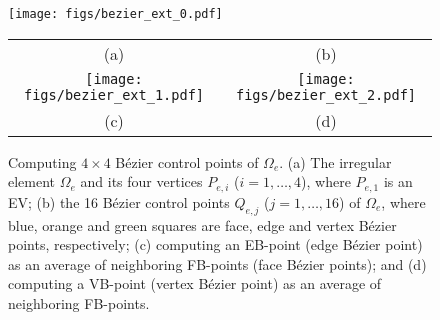 \documentclass[graybox]{svmult}
\begin{document}
\begin{figure}[htb]
\centering
\texttt{[image: figs/bezier\_ext\_0.pdf]}
\begin{tabular}{cc}
(a) & \hspace{-1.5cm} (b) \\
\texttt{[image: figs/bezier\_ext\_1.pdf]} & \hspace{+1mm}
\texttt{[image: figs/bezier\_ext\_2.pdf]} \\
(c) & (d) \\
\end{tabular}
\caption{Computing $4\times 4$ B\'{e}zier control points of $\Omega_e$. (a) The irregular element $\Omega_e$ and its four vertices $P_{e,i}$ ($i=1,\ldots,4$), where $P_{e,1}$ is an EV; (b) the 16 B\'{e}zier control points $Q_{e,j}$ ($j=1,\ldots,16$) of $\Omega_e$, where blue, orange and green squares are face, edge and vertex B\'{e}zier points, respectively; (c) computing an EB-point (edge B\'{e}zier point) as an average of neighboring FB-points (face B\'{e}zier points); and (d) computing a VB-point (vertex B\'{e}zier point) as an average of neighboring FB-points.}
\label{fig:bezier_ext}
\end{figure}
\end{document}
